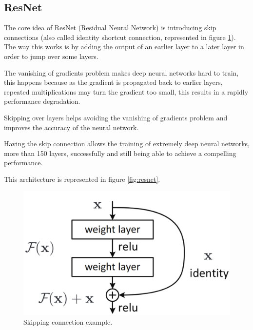    
    \newpage
    

    \subsection{ResNet}

    The core idea of ResNet (Residual Neural Network) is introducing skip connections (also called identity shortcut connection, represented in figure \ref{fig:skip}). The way this works is by adding the output of an earlier layer to a later layer in order to jump over some layers. \par

    The vanishing of gradients problem makes deep neural networks hard to train, this happens because as the gradient is propagated back to earlier layers, repeated multiplications may turn the gradient too small, this results in a rapidly performance degradation. \par
    
    Skipping over layers helps avoiding the vanishing of gradients problem and improves the accuracy of the neural network. \par

    Having the skip connection allows the training of extremely deep neural networks, more than 150 layers, successfully and still being able to 
    achieve a compelling performance. \cite{He2016} \par
    \par This architecture is represented in figure \ref{fig:resnet}.
    \begin{figure}[htb]
        \centering
        \includegraphics[scale = 0.12]{Sections/2StateOfTheArt/2_images/resnet_block.png}
        \caption{Skipping connection example.\cite{He2016}} 
        \label{fig:skip}
    \end{figure}

